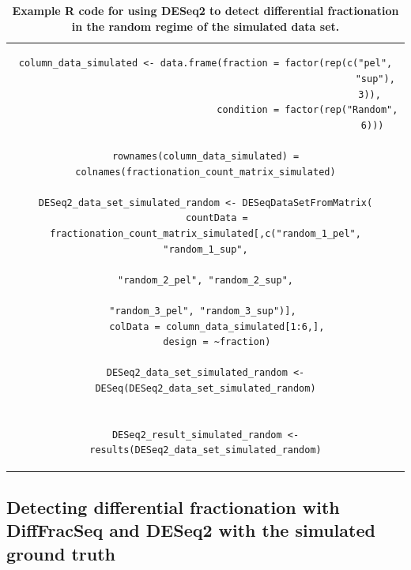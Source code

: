 \documentclass[../main.tex]{subfiles}
\begin{document}
\makeatletter
\renewcommand{\fnum@table}{Listing \thetable}
\makeatother

\begin{table}
\begin{tabular}{c}
\begin{lstlisting}[style=mystyle, language=DESeq]
column_data_simulated <- data.frame(fraction = factor(rep(c("pel",
                                                            "sup"),
                                                          3)),
                                    condition = factor(rep("Random",
                                                           6)))

rownames(column_data_simulated) = colnames(fractionation_count_matrix_simulated)

DESeq2_data_set_simulated_random <- DESeqDataSetFromMatrix(
    countData = fractionation_count_matrix_simulated[,c("random_1_pel", "random_1_sup",
                                                        "random_2_pel", "random_2_sup",
                                                        "random_3_pel", "random_3_sup")], 
    colData = column_data_simulated[1:6,],
    design = ~fraction)

DESeq2_data_set_simulated_random <- DESeq(DESeq2_data_set_simulated_random)


DESeq2_result_simulated_random <- results(DESeq2_data_set_simulated_random)
\end{lstlisting} \\
\end{tabular}
\caption[DESeq2 example R code]{\textbf{Example R code for using DESeq2 to detect differential fractionation in the random regime of the simulated data set.}}
\label{tab:DESeq2-r-code}
\end{table}

\makeatletter
\renewcommand{\fnum@table}{Table \thetable}
\makeatother

\subsection{Detecting differential fractionation with DiffFracSeq and DESeq2 with the simulated ground truth}
\end{document}
